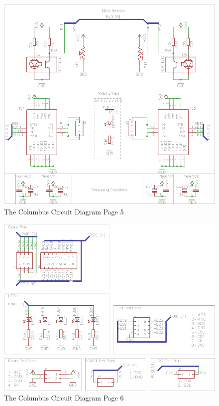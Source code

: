 \begin{figure}[ht!]
\centering
\includegraphics[angle = 90, width=\textwidth,height=\textheight,keepaspectratio]{./Figures/ColumbusCircuitPage5.png}
\caption{The Columbus Circuit Diagram Page 5}
\label{sch:Columbus_Schematic:5}
\end{figure}

\begin{figure}[ht!]
\centering
\includegraphics[angle = 90, width=\textwidth,height=\textheight,keepaspectratio]{./Figures/ColumbusCircuitPage6.png}
\caption{The Columbus Circuit Diagram Page 6}
\label{sch:Columbus_Schematic:6}
\end{figure}

